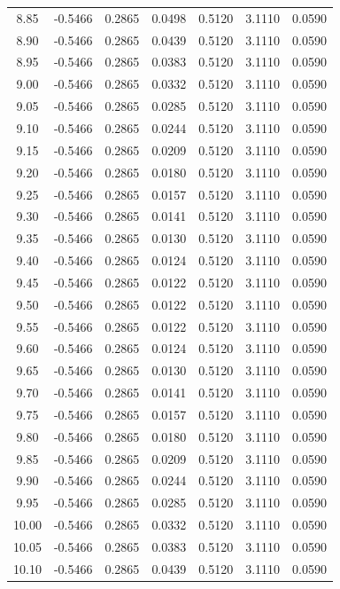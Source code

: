\begin{longtable}{|c|c|c|c|c|c|c|}
8.85 & -0.5466 & 0.2865 & 0.0498 & 0.5120 & 3.1110 & 0.0590 \\
8.90 & -0.5466 & 0.2865 & 0.0439 & 0.5120 & 3.1110 & 0.0590 \\
8.95 & -0.5466 & 0.2865 & 0.0383 & 0.5120 & 3.1110 & 0.0590 \\
9.00 & -0.5466 & 0.2865 & 0.0332 & 0.5120 & 3.1110 & 0.0590 \\
9.05 & -0.5466 & 0.2865 & 0.0285 & 0.5120 & 3.1110 & 0.0590 \\
9.10 & -0.5466 & 0.2865 & 0.0244 & 0.5120 & 3.1110 & 0.0590 \\
9.15 & -0.5466 & 0.2865 & 0.0209 & 0.5120 & 3.1110 & 0.0590 \\
9.20 & -0.5466 & 0.2865 & 0.0180 & 0.5120 & 3.1110 & 0.0590 \\
9.25 & -0.5466 & 0.2865 & 0.0157 & 0.5120 & 3.1110 & 0.0590 \\
9.30 & -0.5466 & 0.2865 & 0.0141 & 0.5120 & 3.1110 & 0.0590 \\
9.35 & -0.5466 & 0.2865 & 0.0130 & 0.5120 & 3.1110 & 0.0590 \\
9.40 & -0.5466 & 0.2865 & 0.0124 & 0.5120 & 3.1110 & 0.0590 \\
9.45 & -0.5466 & 0.2865 & 0.0122 & 0.5120 & 3.1110 & 0.0590 \\
9.50 & -0.5466 & 0.2865 & 0.0122 & 0.5120 & 3.1110 & 0.0590 \\
9.55 & -0.5466 & 0.2865 & 0.0122 & 0.5120 & 3.1110 & 0.0590 \\
9.60 & -0.5466 & 0.2865 & 0.0124 & 0.5120 & 3.1110 & 0.0590 \\
9.65 & -0.5466 & 0.2865 & 0.0130 & 0.5120 & 3.1110 & 0.0590 \\
9.70 & -0.5466 & 0.2865 & 0.0141 & 0.5120 & 3.1110 & 0.0590 \\
9.75 & -0.5466 & 0.2865 & 0.0157 & 0.5120 & 3.1110 & 0.0590 \\
9.80 & -0.5466 & 0.2865 & 0.0180 & 0.5120 & 3.1110 & 0.0590 \\
9.85 & -0.5466 & 0.2865 & 0.0209 & 0.5120 & 3.1110 & 0.0590 \\
9.90 & -0.5466 & 0.2865 & 0.0244 & 0.5120 & 3.1110 & 0.0590 \\
9.95 & -0.5466 & 0.2865 & 0.0285 & 0.5120 & 3.1110 & 0.0590 \\
10.00 & -0.5466 & 0.2865 & 0.0332 & 0.5120 & 3.1110 & 0.0590 \\
10.05 & -0.5466 & 0.2865 & 0.0383 & 0.5120 & 3.1110 & 0.0590 \\
10.10 & -0.5466 & 0.2865 & 0.0439 & 0.5120 & 3.1110 & 0.0590 \\

\end{longtable}
